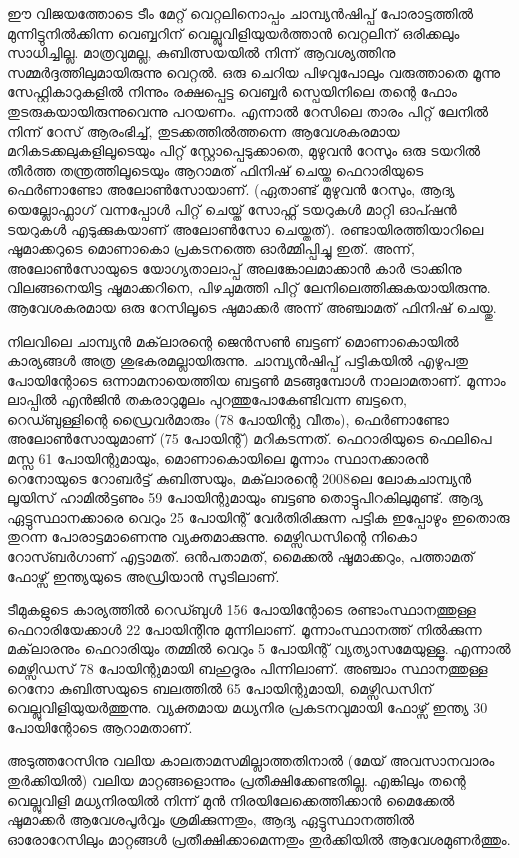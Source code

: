 ഈ വിജയത്തോടെ ടീം മേറ്റ് വെറ്റലിനൊപ്പം ചാമ്പ്യന്‍ഷിപ്പ് പോരാട്ടത്തില്‍ മുന്നിട്ടുനില്‍ക്കിന്ന വെബ്ബറിന് 
വെല്ലുവിളിയുയര്‍ത്താന്‍ വെറ്റലിന് ഒരിക്കലും സാധിച്ചില്ല. മാത്രവുമല്ല, കുബിത്സയയില്‍ നിന്ന് ആവശ്യത്തിനു 
സമ്മര്‍ദ്ദത്തിലുമായിരുന്നു വെറ്റല്‍. ഒരു ചെറിയ പിഴവുപോലും വരുത്താതെ മൂന്നു സേഫ്റ്റികാറുകളില്‍ നിന്നും രക്ഷപ്പെട്ട 
വെബ്ബര്‍ സ്പെയിനിലെ തന്റെ ഫോം തുടരുകയായിരുന്നുവെന്നു പറയണം. എന്നാല്‍ റേസിലെ താരം പിറ്റ് ലേനില്‍ നിന്ന് 
റേസ് ആരംഭിച്ച്, തുടക്കത്തില്‍ത്തന്നെ ആവേശകരമായ മറികടക്കലുകളിലൂടെയും പിറ്റ് സ്റ്റോപ്പെടുക്കാതെ, മുഴുവന്‍ റേസും 
ഒരു ടയറില്‍ തീര്‍ത്ത തന്ത്രത്തിലൂടെയും ആറാമത് ഫിനിഷ് ചെയ്ത ഫെറാരിയുടെ ഫെര്‍ണാണ്ടോ അലോണ്‍സോയാണ്. 
(ഏതാണ്ട് മുഴുവന്‍ റേസും, ആദ്യ യെല്ലോഫ്ലാഗ് വന്നപ്പോള്‍ പിറ്റ് ചെയ്ത് സോഫ്റ്റ് ടയറുകള്‍ മാറ്റി ഓപ്ഷന്‍ ടയറുകള്‍ 
എടുക്കുകയാണ് അലോണ്‍സോ ചെയ്തത്). രണ്ടായിരത്തിയാറിലെ ഷൂമാക്കറുടെ മൊണാകൊ പ്രകടനത്തെ ഓര്‍മ്മിപ്പിച്ചു 
ഇത്. അന്ന്, അലോണ്‍സോയുടെ യോഗ്യതാലാപ്പ് അലങ്കോലമാക്കാന്‍ കാര്‍ ട്രാക്കിനു വിലങ്ങനെയിട്ട ഷൂമാക്കറിനെ, 
പിഴചുമത്തി പിറ്റ് ലേനിലെത്തിക്കുകയായിരുന്നു. ആവേശകരമായ ഒരു റേസിലൂടെ ഷുമാക്കര്‍ അന്ന് അഞ്ചാമത് ഫിനിഷ് 
ചെയ്തു.

നിലവിലെ ചാമ്പ്യന്‍ മക്‌ലാരന്റെ ജെന്‍സണ്‍ ബട്ടണ് മൊണാകൊയില്‍ കാര്യങ്ങള്‍ അത്ര ശുഭകരമല്ലായിരുന്നു. 
ചാമ്പ്യന്‍ഷിപ്പ് പട്ടികയില്‍ എഴുപതു പോയിന്റോടെ ഒന്നാമനായെത്തിയ ബട്ടണ്‍ മടങ്ങുമ്പോള്‍ നാലാമതാണ്. മൂന്നാം 
ലാപ്പില്‍ എന്‍ജിന്‍ തകരാറുമൂലം പുറത്തുപോകേണ്ടിവന്ന ബട്ടനെ, റെഡ്ബുള്ളിന്റെ ഡ്രൈവര്‍മാരും (78 പോയിന്റു വീതം),
ഫെര്‍ണാണ്ടോ അലോണ്‍സോയുമാണ് (75 പോയിന്റ്) മറികടന്നത്. ഫെറാരിയുടെ ഫെലിപെ മസ്സ 61 പോയിന്റുമായും, 
മൊണാകൊയിലെ മൂന്നാം സ്ഥാനക്കാരന്‍ റെനോയുടെ റോബര്‍ട്ട് കുബിത്സയും, മക്‌ലാരന്റെ 2008ലെ ലോകചാമ്പ്യന്‍ 
ലൂയിസ് ഹാമില്‍ട്ടണും 59 പോയിന്റുമായും ബട്ടണു തൊട്ടുപിറകിലുമുണ്ട്. ആദ്യ ഏട്ടുസ്ഥാനക്കാരെ വെറും 25 പോയിന്റ് 
വേര്‍തിരിക്കുന്ന പട്ടിക ഇപ്പോഴും ഇതൊരു തുറന്ന പോരാട്ടമാണെന്നു വ്യക്തമാക്കുന്നു. മെഴ്സിഡസിന്റെ നികൊ 
റോസ്ബര്‍ഗാണ് എട്ടാമത്. ഒന്‍പതാമത്, മൈക്കല്‍ ഷൂമാക്കറും, പത്താമത് ഫോഴ്സ് ഇന്ത്യയുടെ അഡ്രിയാന്‍ സുടിലാണ്.

ടീമുകളുടെ കാര്യത്തില്‍ റെഡ്ബുള്‍ 156 പോയിന്റോടെ രണ്ടാംസ്ഥാനത്തുള്ള ഫെറാരിയേക്കാള്‍ 22 പോയിന്റിനു 
മുന്നിലാണ്. മൂന്നാംസ്ഥാനത്ത് നില്‍ക്കുന്ന മക്‌ലാരനും ഫെറാരിയും തമ്മില്‍ വെറും 5 പോയിന്റ് വ്യത്യാസമേയുള്ളൂ. 
എന്നാല്‍ മെഴ്സിഡസ് 78 പോയിന്റുമായി ബഹുദൂരം പിന്നിലാണ്. അഞ്ചാം സ്ഥാനത്തുള്ള റെനോ കുബിത്സയുടെ 
ബലത്തില്‍ 65 പോയിന്റുമായി, മെഴ്സിഡസിന് വെല്ലുവിളിയുയര്‍ത്തുന്നു. വ്യക്തമായ മധ്യനിര പ്രകടനവുമായി ഫോഴ്സ് 
ഇന്ത്യ 30 പോയിന്റോടെ ആറാമതാണ്.

അടുത്തറേസിനു വലിയ കാലതാമസമില്ലാത്തതിനാല്‍ (മേയ് അവസാനവാരം തുര്‍ക്കിയില്‍) വലിയ മാറ്റങ്ങളൊന്നും 
പ്രതീക്ഷിക്കേണ്ടതില്ല. എങ്കിലും തന്റെ വെല്ലുവിളി മധ്യനിരയില്‍ നിന്ന് മുന്‍ നിരയിലേക്കെത്തിക്കാന്‍ മൈക്കേല്‍ ഷൂമാക്കര്‍ 
ആവേശപൂര്‍വ്വം ശ്രമിക്കുന്നതും, ആദ്യ ഏട്ടുസ്ഥാനത്തില്‍ ഓരോറേസിലും മാറ്റങ്ങള്‍ പ്രതീക്ഷിക്കാമെന്നതും തുര്‍ക്കിയില്‍ 
ആവേശമുണര്‍ത്തും.

